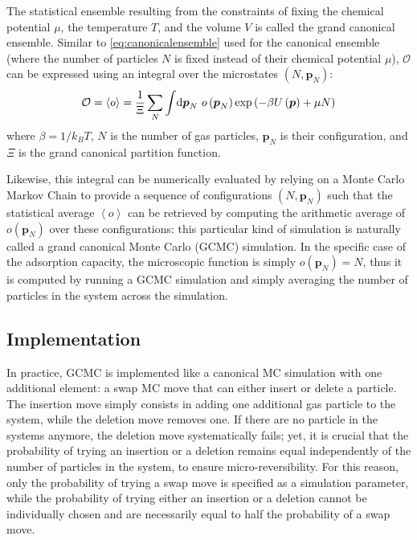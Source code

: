 \documentclass[main.tex]{subfiles}
\begin{document}
The statistical ensemble resulting from the constraints of fixing the chemical potential $\mu$, the temperature $T$, and the volume $V$ is called the grand canonical ensemble. Similar to \cref{eq:canonicalensemble} used for the canonical ensemble (where the number of particles $N$ is fixed instead of their chemical potential $\mu$), $\mathcal O$ can be expressed using an integral over the microstates $(N,\boldsymbol p_N)$:
\[\mathcal O = \left<o\right> = \frac1\Xi\sum_N\int\!\text d{\boldsymbol p_N}\  o\left({\boldsymbol p_N}\right)\exp\left(-\beta U\left({\boldsymbol p}\right) + \mu N\right)\label{eq:grandcanonicalensemble}\]
where $\beta = 1/k_BT$, $N$ is the number of gas particles, $\boldsymbol p_N$ is their configuration, and $\Xi$ is the grand canonical partition function.

Likewise, this integral can be numerically evaluated by relying on a Monte Carlo Markov Chain to provide a sequence of configurations $(N, \boldsymbol p_N)$ such that the statistical average $\left<o\right>$ can be retrieved by computing the arithmetic average of $o\left({\boldsymbol p_N}\right)$ over these configurations: this particular kind of simulation is naturally called a grand canonical Monte Carlo (GCMC) simulation. In the specific case of the adsorption capacity, the microscopic function is simply $o\left({\boldsymbol p_N}\right) = N$, thus it is computed by running a GCMC simulation and simply averaging the number of particles in the system across the simulation.

\subsection{Implementation}
\label{gcmc_implementation}

In practice, GCMC is implemented like a canonical MC simulation with one additional element: a swap MC move that can either insert or delete a particle. The insertion move simply consists in adding one additional gas particle to the system, while the deletion move removes one. If there are no particle in the systems anymore, the deletion move systematically fails; yet, it is crucial that the probability of trying an insertion or a deletion remains equal independently of the number of particles in the system, to ensure micro-reversibility. For this reason, only the probability of trying a swap move is specified as a simulation parameter, while the probability of trying either an insertion or a deletion cannot be individually chosen and are necessarily equal to half the probability of a swap move.
\end{document}

